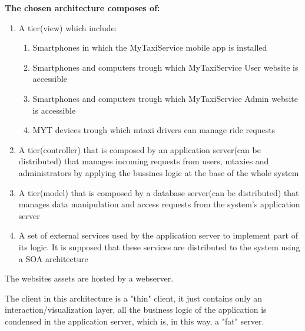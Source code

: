 \documentclass[11pt,titlepage]{article} %
\begin{document}
        \noindent \textbf{The chosen architecture composes of:}
         \begin{enumerate}
	          \item A tier(view) which include:
		\begin{enumerate}
		            \item Smartphones in which the MyTaxiService mobile app is installed
		            \item Smartphones and computers trough which MyTaxiService User website is accessible
		            \item Smartphones and computers trough which MyTaxiService Admin website is accessible
		            \item MYT devices trough which mtaxi drivers can manage ride requests
		\end{enumerate}

	          \item A tier(controller) that is composed by an application server(can be distributed) that manages incoming requests from users,
	          mtaxies and administrators by applying the bussines logic at the base of the whole system
	          \item A tier(model) that is composed by a database server(can be distributed) that manages data manipulation and access requests from
	          the system's application server
	          \item A set of external services used by the application server to implement part of its logic. It is supposed that these
	          services are distributed to the system using a SOA architecture
	\end{enumerate}
	The websites assets are hosted by a webserver.\newline

        \noindent The client in this architecture is a "thin" client, it just contains only an interaction/visualization layer, all
        the business logic of the application is condensed in the application server, which is, in this way, a "fat" server.\newline
\end{document}
